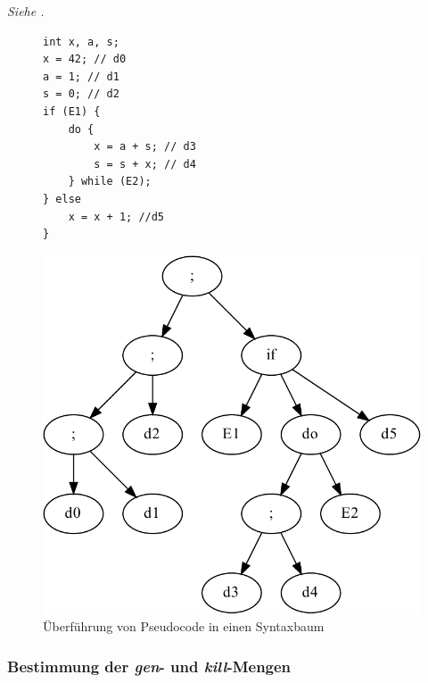 \textit{Siehe .}
\begin{figure}[p]
    \hfill
    \begin{minipage}{0.4\textwidth}
        \centering
        \begin{lstlisting}
int x, a, s;
x = 42; // d0
a = 1; // d1
s = 0; // d2
if (E1) {
    do {
        x = a + s; // d3
        s = s + x; // d4
    } while (E2);
} else
    x = x + 1; //d5
}
        \end{lstlisting}
    \end{minipage}
    \hfill
    \begin{minipage}{0.5\textwidth}
        \includegraphics[scale=0.5]{images/convent-ast.pdf}
    \end{minipage}
    \hfill
    \caption{Überführung von Pseudocode in einen Syntaxbaum}
    \label{convent:ast}
\end{figure}


\subsubsection{Bestimmung der \textit{gen}- und \textit{kill}-Mengen}

